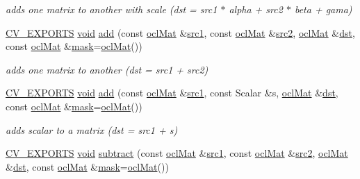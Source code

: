 \begin{DoxyCompactItemize}
\begin{DoxyCompactList}\small\item\em adds one matrix to another with scale (dst = src1 $\ast$ alpha + src2 $\ast$ beta + gama) \end{DoxyCompactList}\item 
\hyperlink{core_2types__c_8h_a1bf9f0e121b54272da02379cfccd0a2b}{C\-V\-\_\-\-E\-X\-P\-O\-R\-T\-S} \hyperlink{legacy_8hpp_a8bb47f092d473522721002c86c13b94e}{void} \hyperlink{namespacecv_1_1ocl_adc36ffcff35e49ef3e175cfb6fafb9e0}{add} (const \hyperlink{classcv_1_1ocl_1_1oclMat}{ocl\-Mat} \&\hyperlink{core__c_8h_a897de4702c922f4cccda0d57ccdcafb3}{src1}, const \hyperlink{classcv_1_1ocl_1_1oclMat}{ocl\-Mat} \&\hyperlink{core__c_8h_a7561a36d48069d54a6c8ac4e4750edfd}{src2}, \hyperlink{classcv_1_1ocl_1_1oclMat}{ocl\-Mat} \&\hyperlink{photo__c_8h_aed13e2a25279b24dc954073233fef7a5}{dst}, const \hyperlink{classcv_1_1ocl_1_1oclMat}{ocl\-Mat} \&\hyperlink{tracking_8hpp_a6b13ecd2fd6ec7ad422f1d7863c3ad19}{mask}=\hyperlink{classcv_1_1ocl_1_1oclMat}{ocl\-Mat}())
\begin{DoxyCompactList}\small\item\em adds one matrix to another (dst = src1 + src2) \end{DoxyCompactList}\item 
\hyperlink{core_2types__c_8h_a1bf9f0e121b54272da02379cfccd0a2b}{C\-V\-\_\-\-E\-X\-P\-O\-R\-T\-S} \hyperlink{legacy_8hpp_a8bb47f092d473522721002c86c13b94e}{void} \hyperlink{namespacecv_1_1ocl_aac798b029b9dcebc5266bf2dac26febf}{add} (const \hyperlink{classcv_1_1ocl_1_1oclMat}{ocl\-Mat} \&\hyperlink{core__c_8h_a897de4702c922f4cccda0d57ccdcafb3}{src1}, const Scalar \&s, \hyperlink{classcv_1_1ocl_1_1oclMat}{ocl\-Mat} \&\hyperlink{photo__c_8h_aed13e2a25279b24dc954073233fef7a5}{dst}, const \hyperlink{classcv_1_1ocl_1_1oclMat}{ocl\-Mat} \&\hyperlink{tracking_8hpp_a6b13ecd2fd6ec7ad422f1d7863c3ad19}{mask}=\hyperlink{classcv_1_1ocl_1_1oclMat}{ocl\-Mat}())
\begin{DoxyCompactList}\small\item\em adds scalar to a matrix (dst = src1 + s) \end{DoxyCompactList}\item 
\hyperlink{core_2types__c_8h_a1bf9f0e121b54272da02379cfccd0a2b}{C\-V\-\_\-\-E\-X\-P\-O\-R\-T\-S} \hyperlink{legacy_8hpp_a8bb47f092d473522721002c86c13b94e}{void} \hyperlink{namespacecv_1_1ocl_a4b852b8b39561a6970865d65c6c0e5a8}{subtract} (const \hyperlink{classcv_1_1ocl_1_1oclMat}{ocl\-Mat} \&\hyperlink{core__c_8h_a897de4702c922f4cccda0d57ccdcafb3}{src1}, const \hyperlink{classcv_1_1ocl_1_1oclMat}{ocl\-Mat} \&\hyperlink{core__c_8h_a7561a36d48069d54a6c8ac4e4750edfd}{src2}, \hyperlink{classcv_1_1ocl_1_1oclMat}{ocl\-Mat} \&\hyperlink{photo__c_8h_aed13e2a25279b24dc954073233fef7a5}{dst}, const \hyperlink{classcv_1_1ocl_1_1oclMat}{ocl\-Mat} \&\hyperlink{tracking_8hpp_a6b13ecd2fd6ec7ad422f1d7863c3ad19}{mask}=\hyperlink{classcv_1_1ocl_1_1oclMat}{ocl\-Mat}())

\end{DoxyCompactItemize}
